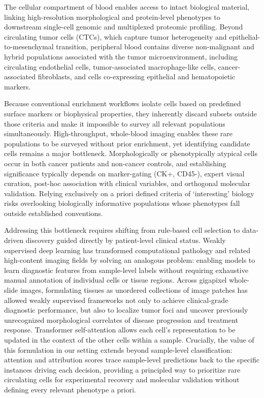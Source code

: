 \documentclass[11pt]{article}
\begin{document}
The cellular compartment of blood enables access to intact biological material, linking high-resolution morphological and protein-level phenotypes to downstream single-cell genomic and multiplexed proteomic profiling\cite{dago2014,gerdtsson2018}. Beyond circulating tumor cells (CTCs), which capture tumor heterogeneity and epithelial-to-mesenchymal transition\cite{yu2013}, peripheral blood contains diverse non-malignant and hybrid populations associated with the tumor microenvironment, including circulating endothelial cells\cite{bertolini2006}, tumor-associated macrophage-like cells\cite{adams2014}, cancer-associated fibroblasts\cite{ao2015}, and cells co-expressing epithelial and hematopoietic markers\cite{gast2018,higa2025,naghdloo2025caught}.

Because conventional enrichment workflows isolate cells based on predefined surface markers or biophysical properties\cite{allard2004,nagrath2007,vona2000,ozkumur2013,sollier2014}, they inherently discard subsets outside those criteria and make it impossible to survey all relevant populations simultaneously. High-throughput, whole-blood imaging enables these rare populations to be surveyed without prior enrichment\cite{marrinucci2012}, yet identifying candidate cells remains a major bottleneck\cite{murgoitio2025,naghdloo2025blue}. Morphologically or phenotypically atypical cells occur in both cancer patients and non-cancer controls, and establishing significance typically depends on marker-gating (CK+, CD45-), expert visual curation, post-hoc association with clinical variables, and orthogonal molecular validation\cite{bai2024,resnick2024,malihi2020,shishido2025}. Relying exclusively on a priori defined criteria of `interesting' biology risks overlooking biologically informative populations whose phenotypes fall outside established conventions.

Addressing this bottleneck requires shifting from rule-based cell selection to data-driven discovery guided directly by patient-level clinical status. Weakly supervised deep learning has transformed computational pathology and related high-content imaging fields by solving an analogous problem: enabling models to learn diagnostic features from sample-level labels without requiring exhaustive manual annotation of individual cells or tissue regions\cite{campanella2019,lu2021}. Across gigapixel whole-slide images, formulating tissues as unordered collections of image patches has allowed weakly supervised frameworks not only to achieve clinical-grade diagnostic performance, but also to localize tumor foci and uncover previously unrecognized morphological correlates of disease progression and treatment response\cite{campanella2019,lu2021,courtiol2019,skrede2020}. Transformer self-attention allows each cell's representation to be updated in the context of the other cells within a sample\cite{vaswani2017,lee2019,shao2021,wagner2023}. Crucially, the value of this formulation in our setting extends beyond sample-level classification: attention and attribution scores trace sample-level predictions back to the specific instances driving each decision, providing a principled way to prioritize rare circulating cells for experimental recovery and molecular validation without defining every relevant phenotype a priori.
\end{document}
